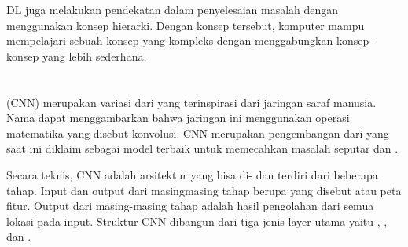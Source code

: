 DL juga melakukan pendekatan dalam penyelesaian masalah dengan menggunakan konsep hierarki.
Dengan konsep tersebut, komputer mampu mempelajari sebuah konsep yang kompleks dengan menggabungkan
konsep-konsep yang lebih sederhana.

\section{}
 (CNN) merupakan variasi dari  yang terinspirasi dari jaringan saraf manusia\citep{CNN2017}.
Nama  dapat menggambarkan bahwa jaringan ini menggunakan operasi matematika yang disebut konvolusi.
CNN merupakan pengembangan dari  yang saat ini diklaim sebagai model terbaik untuk memecahkan masalah
seputar  dan .

Secara teknis, CNN adalah arsitektur yang bisa di-
dan terdiri dari beberapa tahap. Input dan output dari masingmasing tahap berupa  yang disebut  atau peta fitur. Output dari masing-masing tahap adalah  hasil pengolahan dari semua lokasi pada input. Struktur CNN dibangun dari tiga jenis layer utama yaitu , , dan  \citep{CNN2017}.

